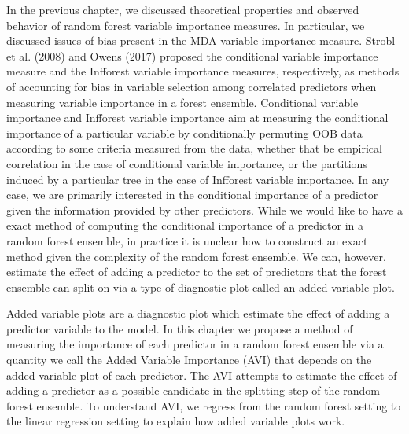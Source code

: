 \documentclass[12pt,twoside]{reedthesis}
\theoremstyle{definition}
\theoremstyle{definition}
\theoremstyle{definition}
\theoremstyle{remark}
\begin{document}
In the previous chapter, we discussed theoretical properties and
observed behavior of random forest variable importance measures. In
particular, we discussed issues of bias present in the MDA variable
importance measure. Strobl et al. (2008) and Owens (2017) proposed the
conditional variable importance measure and the Infforest variable
importance measures, respectively, as methods of accounting for bias in
variable selection among correlated predictors when measuring variable
importance in a forest ensemble. Conditional variable importance and
Infforest variable importance aim at measuring the conditional
importance of a particular variable by conditionally permuting OOB data
according to some criteria measured from the data, whether that be
empirical correlation in the case of conditional variable importance, or
the partitions induced by a particular tree in the case of Infforest
variable importance. In any case, we are primarily interested in the
conditional importance of a predictor given the information provided by
other predictors. While we would like to have a exact method of
computing the conditional importance of a predictor in a random forest
ensemble, in practice it is unclear how to construct an exact method
given the complexity of the random forest ensemble. We can, however,
estimate the effect of adding a predictor to the set of predictors that
the forest ensemble can split on via a type of diagnostic plot called an
added variable plot. \par

Added variable plots are a diagnostic plot which estimate the effect of
adding a predictor variable to the model. In this chapter we propose a
method of measuring the importance of each predictor in a random forest
ensemble via a quantity we call the Added Variable Importance (AVI) that
depends on the added variable plot of each predictor. The AVI attempts
to estimate the effect of adding a predictor as a possible candidate in
the splitting step of the random forest ensemble. To understand AVI, we
regress from the random forest setting to the linear regression setting
to explain how added variable plots work. \par
\end{document}
